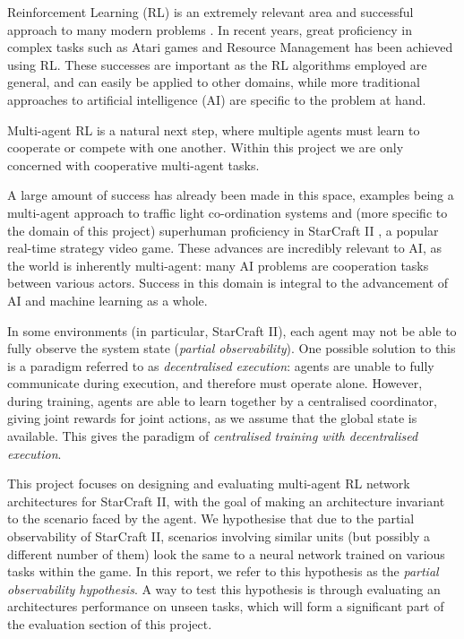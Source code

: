 Reinforcement Learning (RL) is an extremely relevant area and successful approach to many modern problems . In recent years, great proficiency in complex tasks such as Atari games \cite{dqn} and Resource Management \cite{resourcemanagement} has been achieved using RL. These successes are important as the RL algorithms employed are general, and can easily be applied to other domains, while more traditional approaches to artificial intelligence (AI) are specific to the problem at hand. 

Multi-agent RL is a natural next step, where multiple agents must learn to cooperate or compete with one another. Within this project we are only concerned with cooperative multi-agent tasks. 

A large amount of success has already been made in this space, examples being a multi-agent approach to traffic light co-ordination systems \cite{traffic} and (more specific to the domain of this project) superhuman proficiency in StarCraft II \cite{alphastar}, a popular real-time strategy video game. These advances are incredibly relevant to AI, as the world is inherently multi-agent: many AI problems are cooperation tasks between various actors. Success in this domain is integral to the advancement of AI and machine learning as a whole.

In some environments (in particular, StarCraft II), each agent may not be able to fully observe the system state (\textit{partial observability}). One possible solution to this is a paradigm referred to as \textit{decentralised execution}: agents are unable to fully communicate during execution, and therefore must operate alone. However, during training, agents are able to learn together by a centralised coordinator, giving joint rewards for joint actions, as we assume that the global state is available. This gives the paradigm of \textit{centralised training with decentralised execution}.







This project focuses on designing and evaluating multi-agent RL network architectures for StarCraft II, with the goal of making an architecture invariant to the scenario faced by the agent. We hypothesise that due to the partial observability of StarCraft II, scenarios involving similar units (but possibly a different number of them) look the same to a neural network trained on various tasks within the game. In this report, we refer to this hypothesis as the \textit{partial observability hypothesis}. A way to test this hypothesis is through evaluating an architectures performance on unseen tasks, which will form a significant part of the evaluation section of this project.

